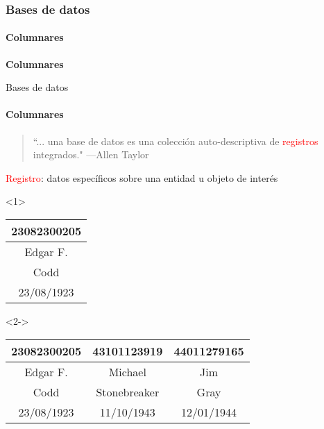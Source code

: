 \begin{frame}
    \frametitle{Bases de datos}
    \framesubtitle{Columnares}

\begin{center}
    \Huge \textbf{Columnares}
\end{center}
\end{frame}

\begin{frame}{Bases de datos}
    \framesubtitle{Columnares}

    \begin{overlayarea}{\linewidth}{\textheight}
            \begin{block}{}
                \begin{quote}
                    ``... una base de datos es una colecci\'on auto-descriptiva de \textcolor{red}{registros} integrados."
                    \hspace{1em plus 1fill}---Allen Taylor
                \end{quote}
                
                \textcolor{red}{Registro}: datos espec\'ificos sobre una entidad u objeto de inter\'es
            \end{block}
      \vspace{8mm}

      \centering

        \begin{onlyenv}<1>
      \begin{tabular}{|c|}
          \hline
           23082300205 \\ \hline
           Edgar F. \\\hline
           Codd \\\hline
           23/08/1923 \\
          \hline
      \end{tabular}
    \end{onlyenv}
     
     \begin{onlyenv}<2->
      \begin{tabular}{|c|c|c|}
          \hline
           23082300205 & 43101123919 & 44011279165 \\ \hline
           Edgar F. & Michael & Jim \\\hline
           Codd & Stonebreaker & Gray \\\hline
           23/08/1923 & 11/10/1943 & 12/01/1944 \\
          \hline
      \end{tabular}
     \end{onlyenv}

    \end{overlayarea}

\end{frame}

